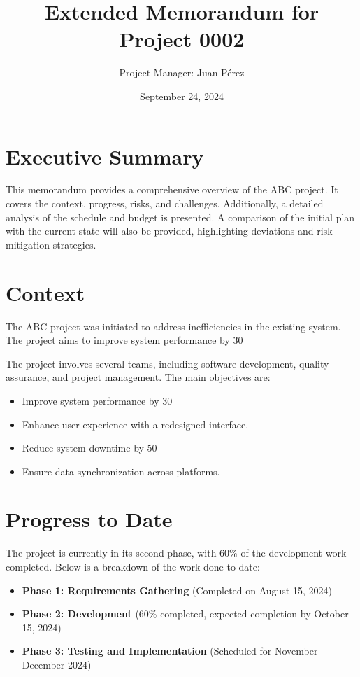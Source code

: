 \documentclass[12pt]{article}
\title{Extended Memorandum for Project 0002}
\author{Project Manager: Juan Pérez}
\date{September 24, 2024}
\begin{document}
\maketitle

\tableofcontents
\newpage

\section{Executive Summary}
This memorandum provides a comprehensive overview of the ABC project. It covers the context, progress, risks, and challenges. Additionally, a detailed analysis of the schedule and budget is presented. A comparison of the initial plan with the current state will also be provided, highlighting deviations and risk mitigation strategies.

\section{Context}
The ABC project was initiated to address inefficiencies in the existing system. The project aims to improve system performance by 30%

The project involves several teams, including software development, quality assurance, and project management. The main objectives are:
\begin{itemize}
    \item Improve system performance by 30%
    \item Enhance user experience with a redesigned interface.
    \item Reduce system downtime by 50%
    \item Ensure data synchronization across platforms.
\end{itemize}

\section{Progress to Date}
The project is currently in its second phase, with 60\% of the development work completed. Below is a breakdown of the work done to date:

\begin{itemize}
    \item \textbf{Phase 1: Requirements Gathering} (Completed on August 15, 2024)
    \item \textbf{Phase 2: Development} (60\% completed, expected completion by October 15, 2024)
    \item \textbf{Phase 3: Testing and Implementation} (Scheduled for November - December 2024)
\end{itemize}
\end{document}
